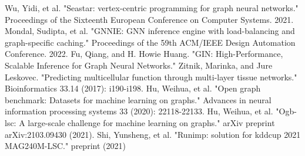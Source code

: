 \documentclass[conference]{IEEEtran}
\begin{document}
\begin{thebibliography}{00}
 Wu, Yidi, et al. "Seastar: vertex-centric programming for graph neural networks." Proceedings of the Sixteenth European Conference on Computer Systems. 2021.
 Mondal, Sudipta, et al. "GNNIE: GNN inference engine with load-balancing and graph-specific caching." Proceedings of the 59th ACM/IEEE Design Automation Conference. 2022.
 Fu, Qiang, and H. Howie Huang. "GIN: High-Performance, Scalable Inference for Graph Neural Networks."
 Zitnik, Marinka, and Jure Leskovec. "Predicting multicellular function through multi-layer tissue networks." Bioinformatics 33.14 (2017): i190-i198.
 Hu, Weihua, et al. "Open graph benchmark: Datasets for machine learning on graphs." Advances in neural information processing systems 33 (2020): 22118-22133.
 Hu, Weihua, et al. "Ogb-lsc: A large-scale challenge for machine learning on graphs." arXiv preprint arXiv:2103.09430 (2021).
 Shi, Yunsheng, et al. "Runimp: solution for kddcup 2021 MAG240M-LSC." preprint (2021)






\end{thebibliography}
\end{document}
